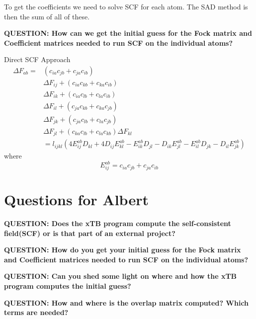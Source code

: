 \documentclass{article}
\newcommand{\q}[1]{\textbf{QUESTION: #1}}
\begin{document}
To get the coefficients we need to solve SCF for each atom.
The SAD method is then the sum of all of these.

\vspace{10pt}
\noindent
\q{How can we get the initial guess for the Fock matrix and Coefficient matrices needed to run SCF on the individual atoms?}

Direct SCF Approach
\begin{equation}
\begin{split}
  \Delta F_{ab} = &(c_{ia}c_{jb} + c_{ja}c_{ib})\\
  &\Delta F_{ij} + (c_{ia}c_{kb} + c_{ka}c_{ib})\\
  &\Delta F_{ik} + (c_{ia}c_{lb} + c_{la}c_{ib})\\
  &\Delta F_{il} + (c_{ja}c_{kb} + c_{ka}c_{jb})\\
  &\Delta F_{jk} + (c_{ja}c_{lb} + c_{la}c_{jb})\\
  &\Delta F_{jl} + (c_{ka}c_{lb} + c_{la}c_{kb}) \Delta F_{kl}\\
  &= l_{ijkl}(4E_{ij}^{ab}D_{kl} + 4D_{ij}E_{kl}^{ab} - E_{ik}^{ab}D_{jl} - D_{ik}E_{jl}^{ab} - E_{il}^{ab}D_{jk} - D_{il}E_{jk}^{ab})
\end{split}
\end{equation}
where
\begin{equation}
  E_{ij}^{ab} = c_{ia}c_{jb} + c_{ja}c_{ib}
\end{equation}



\section{Questions for Albert}

\q{Does the xTB program compute the self-consistent field(SCF) or is that part of an external project?}

\vspace{10pt}
\noindent
\q{How do you get your initial guess for the Fock matrix and Coefficient matrices needed to run SCF on the individual atoms?}

\vspace{10pt}
\noindent
\q{Can you shed some light on where and how the xTB program computes the initial guess?}

\vspace{10pt}
\noindent
\q{How and where is the overlap matrix computed? Which terms are needed?}
\end{document}
